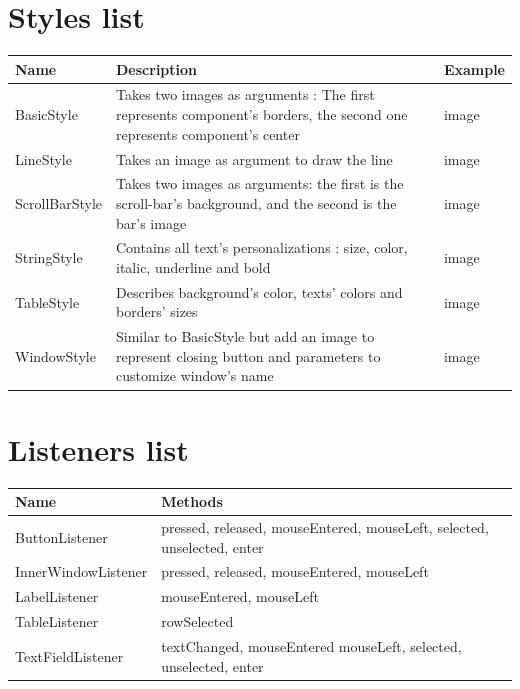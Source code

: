 \documentclass{scrreprt}
\begin{document}
					\chapter{Styles list}
\begin{tabular}{|p{3cm}|p{10cm}|p{2cm}|}
\hline
Name & Description & Example\\
\hline
BasicStyle & Takes two images as arguments : The first represents component's borders, the second one represents component's center & image \\
\hline
LineStyle & Takes an image as argument to draw the line & image \\
\hline
ScrollBarStyle & Takes two images as arguments: the first is the scroll-bar's background, and the second is the bar's image & image \\
\hline
StringStyle & Contains all text's personalizations : size, color, italic, underline and bold & image \\
\hline
TableStyle & Describes background's color, texts' colors and borders' sizes & image \\
\hline
WindowStyle & Similar to BasicStyle but add an image to represent closing button and parameters to customize window's name & image \\
\hline
\end{tabular}

					\chapter{Listeners list}
\begin{tabular}{|p{4cm}|p{10cm}|}
\hline
Name & Methods\\
\hline
ButtonListener & pressed, released, mouseEntered, mouseLeft, selected, unselected, enter \\
\hline
InnerWindowListener & pressed, released, mouseEntered, mouseLeft \\
\hline
LabelListener & mouseEntered, mouseLeft \\
\hline
TableListener & rowSelected \\
\hline
TextFieldListener & textChanged, mouseEntered mouseLeft, selected, unselected, enter \\
\hline
\end{tabular}
\end{document}
